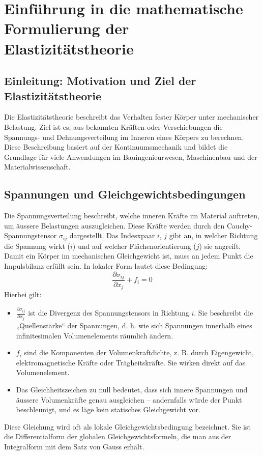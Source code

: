 %
%
%
%
\section{Einführung in die mathematische Formulierung der Elastizitätstheorie
\label{elastomechanik:section:math}}
\subsection{Einleitung: Motivation und Ziel der Elastizitätstheorie}
Die Elastizitätstheorie beschreibt das Verhalten fester Körper unter mechanischer Belastung. 
Ziel ist es, aus bekannten Kräften oder Verschiebungen die Spannungs- und Dehnungsverteilung im Inneren eines Körpers zu berechnen. 
Diese Beschreibung basiert auf der Kontinuumsmechanik und bildet die Grundlage für viele Anwendungen im Bauingenieurwesen, Maschinenbau und der Materialwissenschaft.

\subsection{Spannungen und Gleichgewichtsbedingungen
\label{elastomechanik:math:subsection:gleichgewicht}}
Die Spannungsverteilung beschreibt, welche inneren Kräfte im Material auftreten, um äussere Belastungen auszugleichen. 
Diese Kräfte werden durch den Cauchy-Spannungstensor $\sigma_{ij}$ dargestellt. 
Das Indesxpaar $i$, $j$ gibt an, in welcher Richtung die Spannung wirkt ($i$) und auf welcher Flächenorientierung ($j$) sie angreift.
Damit ein Körper im mechanischen Gleichgewicht ist, muss an jedem Punkt die Impulsbilanz erfüllt sein. In lokaler Form lautet diese Bedingung:
\begin{equation}
	\frac{\partial \sigma_{ij}}{\partial x_j} + f_i = 
	0
\label{elastomechanik:math:eqn:gleichgewicht}
\end{equation}
Hierbei gilt:
\begin{itemize}
	\item $\frac{\partial \sigma_{ij}}{\partial x_j}$ ist die Divergenz des Spannungstensors in Richtung $i$. 
	Sie beschreibt die „Quellenstärke“ der Spannungen, d. h. wie sich Spannungen innerhalb eines infinitesimalen Volumenelements räumlich ändern.
	\item $f_i$ sind die Komponenten der Volumenkraftdichte, z. B. durch Eigengewicht, elektromagnetische Kräfte oder Trägheitskräfte. Sie wirken direkt auf das Volumenelement.
	\item Das Gleichheitszeichen zu null bedeutet, dass sich innere Spannungen und äussere Volumenkräfte genau ausgleichen – andernfalls würde der Punkt beschleunigt, und es läge kein statisches Gleichgewicht vor.
\end{itemize}
Diese Gleichung wird oft als lokale Gleichgewichtsbedingung bezeichnet. 
Sie ist die Differentialform der globalen Gleichgewichtsformeln, die man aus der Integralform mit dem Satz von Gauss erhält.


